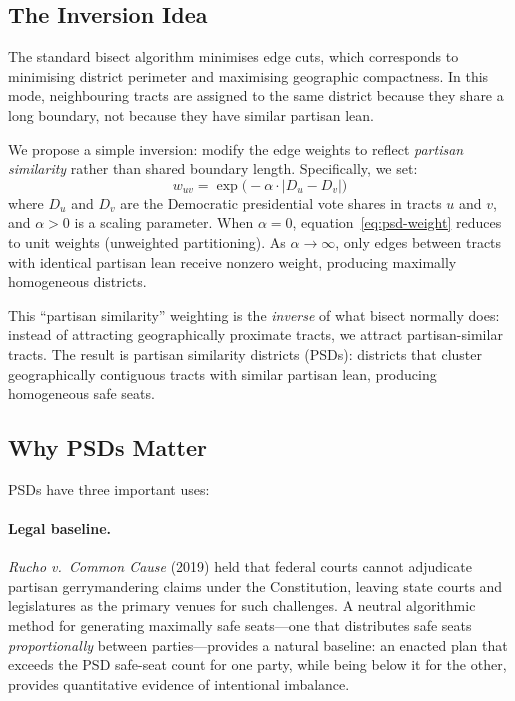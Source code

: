 \subsection{The Inversion Idea}

The standard bisect algorithm minimises edge cuts, which corresponds to
minimising district perimeter and maximising geographic compactness.  In
this mode, neighbouring tracts are assigned to the same district because they
share a long boundary, not because they have similar partisan lean.

We propose a simple inversion: modify the edge weights to reflect
\emph{partisan similarity} rather than shared boundary length.  Specifically,
we set:
\begin{equation}
  w_{uv} = \exp\!\bigl(-\alpha \cdot |D_u - D_v|\bigr)
  \label{eq:psd-weight}
\end{equation}
where $D_u$ and $D_v$ are the Democratic presidential vote shares in tracts
$u$ and $v$, and $\alpha > 0$ is a scaling parameter.  When $\alpha = 0$,
equation~\eqref{eq:psd-weight} reduces to unit weights (unweighted partitioning).
As $\alpha \to \infty$, only edges between tracts with identical partisan
lean receive nonzero weight, producing maximally homogeneous districts.

This ``partisan similarity'' weighting is the \emph{inverse} of what bisect
normally does: instead of attracting geographically proximate tracts, we
attract partisan-similar tracts.  The result is partisan similarity districts
(PSDs): districts that cluster geographically contiguous tracts with similar
partisan lean, producing homogeneous safe seats.

\subsection{Why PSDs Matter}

PSDs have three important uses:

\paragraph{Legal baseline.}
\emph{Rucho v.\ Common Cause} (2019) held that federal courts cannot adjudicate
partisan gerrymandering claims under the Constitution, leaving state courts
and legislatures as the primary venues for such challenges.  A neutral
algorithmic method for generating maximally safe seats---one that distributes
safe seats \emph{proportionally} between parties---provides a natural baseline:
an enacted plan that exceeds the PSD safe-seat count for one party, while
being below it for the other, provides quantitative evidence of intentional
imbalance.

